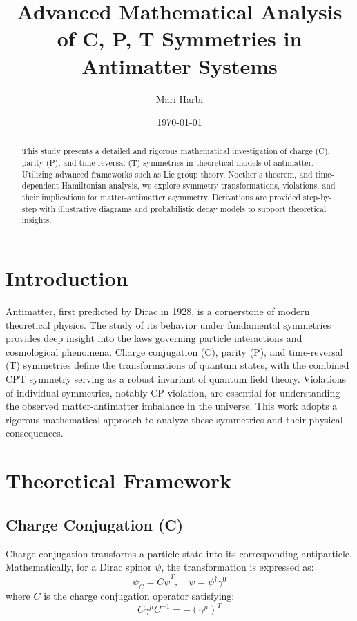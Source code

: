 \documentclass[12pt,a4paper]{article}
\title{Advanced Mathematical Analysis of C, P, T Symmetries in Antimatter Systems}
\author{Mari Harbi}
\date{\today}
\begin{document}
\maketitle

\begin{abstract}
This study presents a detailed and rigorous mathematical investigation of charge (C), parity (P), and time-reversal (T) symmetries in theoretical models of antimatter. Utilizing advanced frameworks such as Lie group theory, Noether's theorem, and time-dependent Hamiltonian analysis, we explore symmetry transformations, violations, and their implications for matter-antimatter asymmetry. Derivations are provided step-by-step with illustrative diagrams and probabilistic decay models to support theoretical insights.
\end{abstract}

\section{Introduction}
Antimatter, first predicted by Dirac in 1928, is a cornerstone of modern theoretical physics. The study of its behavior under fundamental symmetries provides deep insight into the laws governing particle interactions and cosmological phenomena. Charge conjugation (C), parity (P), and time-reversal (T) symmetries define the transformations of quantum states, with the combined CPT symmetry serving as a robust invariant of quantum field theory. Violations of individual symmetries, notably CP violation, are essential for understanding the observed matter-antimatter imbalance in the universe. This work adopts a rigorous mathematical approach to analyze these symmetries and their physical consequences.

\section{Theoretical Framework}

\subsection{Charge Conjugation (C)}
Charge conjugation transforms a particle state into its corresponding antiparticle. Mathematically, for a Dirac spinor $\psi$, the transformation is expressed as:
\begin{equation}
    \psi_C = C \bar{\psi}^T, \quad \bar{\psi} = \psi^\dagger \gamma^0
\end{equation}
where $C$ is the charge conjugation operator satisfying:
\begin{equation}
    C \gamma^\mu C^{-1} = - (\gamma^\mu)^T
\end{equation}
\end{document}
